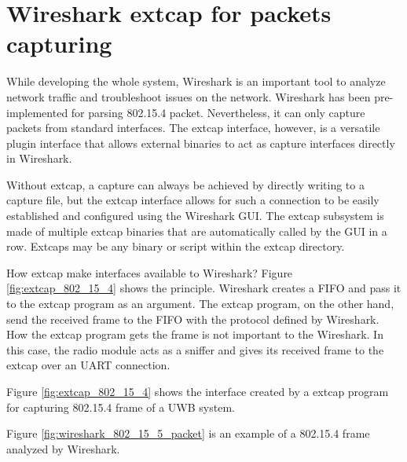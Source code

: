 \documentclass[\main/main.tex]{subfiles}
\begin{document}

\section{Wireshark extcap for packets capturing}
While developing the whole system, Wireshark is an important tool to analyze network traffic and troubleshoot issues on the network. Wireshark has been pre-implemented for parsing 802.15.4 packet. Nevertheless, it can only capture packets from standard interfaces. The extcap interface, however, is a versatile plugin interface that allows external binaries to act as capture interfaces directly in Wireshark.

Without extcap, a capture can always be achieved by directly writing to a capture file, but the extcap interface allows for such a connection to be easily established and configured using the Wireshark GUI. The extcap subsystem is made of multiple extcap binaries that are automatically called by the GUI in a row. Extcaps may be any binary or script within the extcap directory.

How extcap make interfaces available to Wireshark? Figure \ref{fig:extcap_802_15_4} shows the principle. Wireshark creates a FIFO and pass it to the extcap program as an argument. The extcap program, on the other hand, send the received frame to the FIFO with the protocol defined by Wireshark. How the extcap program gets the frame is not important to the Wireshark. In this case, the radio module acts as a sniffer and gives its received frame to the extcap over an UART connection.

Figure \ref{fig:extcap_802_15_4} shows the interface created by a extcap program for capturing 802.15.4 frame of a UWB system.

Figure \ref{fig:wireshark_802_15_5_packet} is an example of a 802.15.4 frame analyzed by Wireshark.
\end{document}

